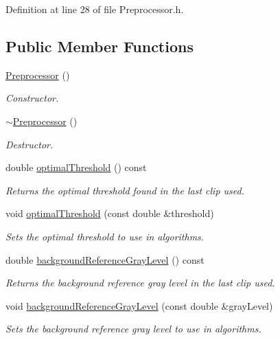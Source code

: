 Definition at line 28 of file Preprocessor.h.\subsection*{Public Member Functions}
\begin{CompactItemize}
\item 
\hyperlink{class_preprocessor_da966c8b83e7c3bcd8759549c3cdf688}{Preprocessor} ()
\begin{CompactList}\small\item\em Constructor. \item\end{CompactList}\item 
\hyperlink{class_preprocessor_3c16724bc9e18b12a45f5a7fe2752b1b}{$\sim$Preprocessor} ()
\begin{CompactList}\small\item\em Destructor. \item\end{CompactList}\item 
double \hyperlink{class_preprocessor_8cc19d799c87198f97356d41606aa4ac}{optimalThreshold} () const 
\begin{CompactList}\small\item\em Returns the optimal threshold found in the last clip used. \item\end{CompactList}\item 
void \hyperlink{class_preprocessor_50f1344cfbab71e64512c994ea4e3a03}{optimalThreshold} (const double \&threshold)
\begin{CompactList}\small\item\em Sets the optimal threshold to use in algorithms. \item\end{CompactList}\item 
double \hyperlink{class_preprocessor_159a9059fc811585eb9363e76ad16148}{backgroundReferenceGrayLevel} () const 
\begin{CompactList}\small\item\em Returns the background reference gray level in the last clip used. \item\end{CompactList}\item 
void \hyperlink{class_preprocessor_df20888f57b15f02ae0d7df536d97ef4}{backgroundReferenceGrayLevel} (const double \&grayLevel)
\begin{CompactList}\small\item\em Sets the background reference gray level to use in algorithms. \item\end{CompactList}\item 

\end{CompactItemize}
